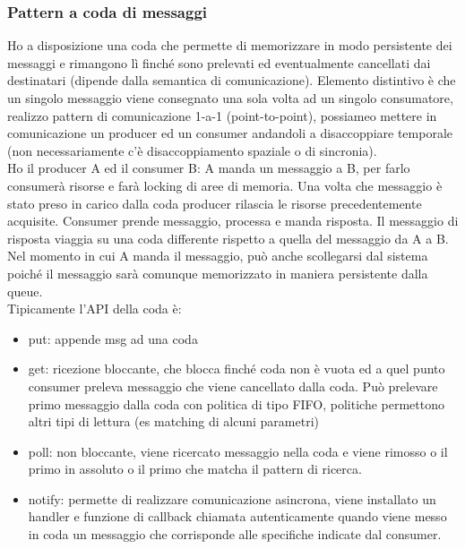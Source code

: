\documentclass{article}
\begin{document}
\subsubsection{Pattern a coda di messaggi}
Ho a disposizione una coda che permette di memorizzare in modo persistente dei messaggi e rimangono lì finché sono prelevati ed eventualmente cancellati dai destinatari (dipende dalla semantica di comunicazione). Elemento distintivo è che un singolo messaggio viene consegnato una sola volta ad un singolo consumatore, realizzo pattern di comunicazione 1-a-1 (point-to-point), possiameo mettere in comunicazione un producer ed un consumer andandoli a disaccoppiare temporale (non necessariamente c'è disaccoppiamento spaziale o di sincronia).\\ Ho il producer A ed il consumer B: A manda un messaggio a B, per farlo consumerà risorse e farà locking di aree di memoria. Una volta che messaggio è stato preso in carico dalla coda producer  rilascia le risorse precedentemente acquisite. Consumer prende messaggio, processa e manda risposta. Il messaggio di risposta viaggia su una coda differente rispetto a quella del messaggio da A a B.\\ Nel momento in cui A manda il messaggio, può anche scollegarsi dal sistema poiché il messaggio sarà comunque memorizzato in maniera persistente dalla queue.\\ Tipicamente l'API della coda è:
\begin{itemize}
\item put: appende msg ad una coda
\item get: ricezione bloccante, che blocca finché coda non è vuota ed a quel punto consumer preleva messaggio che viene cancellato dalla coda. Può prelevare primo messaggio dalla coda con politica di tipo FIFO, politiche permettono altri tipi di lettura (es matching di alcuni parametri)
\item poll: non bloccante, viene ricercato messaggio nella coda e viene rimosso o il primo in assoluto o il primo che matcha il pattern di ricerca.
\item notify: permette di realizzare comunicazione asincrona, viene installato un handler e funzione di callback chiamata autenticamente quando viene messo in coda un messaggio che corrisponde alle specifiche indicate dal consumer.
\end{itemize}
\end{document}
